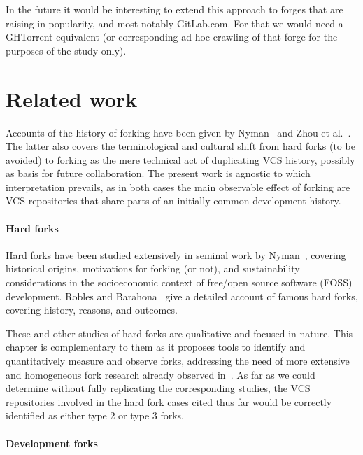 In the future it would be interesting to extend this approach to forges that
are raising in popularity, and most notably GitLab.com. For that we would need
a GHTorrent equivalent (or corresponding ad hoc crawling of that forge for the
purposes of the study only).


\section{Related work}
\label{sec:forks-related}

Accounts of the history of forking have been given by
Nyman~\cite{nyman2016forkhistory} and Zhou et al.~\cite[Section
2]{zhou2019fork}. The latter also covers the terminological and cultural shift
from hard forks (to be avoided) to forking as the mere technical act of
duplicating VCS history, possibly as basis for future collaboration. The
present work is agnostic to which interpretation prevails, as in both cases the
main observable effect of forking are VCS repositories that share parts of an
initially common development history.


\paragraph{Hard forks}

Hard forks have been studied extensively in seminal work by
Nyman~\cite{nyman2011-fork-or-not, nyman2012forking-sustainability,
  nyman2014forking-hackers, nyman2016forkhistory}, covering historical origins,
motivations for forking (or not), and sustainability considerations in the
socioeconomic context of free/open source software (FOSS) development.  Robles
and Barahona~\cite{robles2012forks} give a detailed account of famous hard
forks, covering history, reasons, and outcomes.

These and other studies of hard forks are qualitative and focused in nature.
  This chapter is complementary to
them as it proposes tools to identify and quantitatively measure and observe
forks, addressing the need of more extensive and homogeneous fork research
already observed in~\cite{robles2012forks}. As far as we could determine
without fully replicating the corresponding studies, the VCS repositories
involved in the hard fork cases cited thus far would be correctly identified as
either type 2 or type 3 forks.


\paragraph{Development forks}

